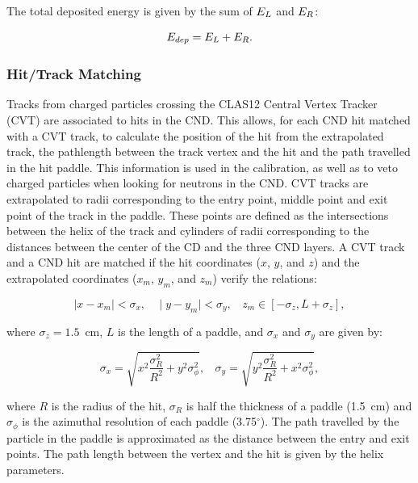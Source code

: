 \documentclass{elsart}
\begin{document}
\noindent
The total deposited energy is given by the sum of $E_{\rm{L}}$ and $E_{\rm{R}}$:

\begin{equation}
E_{\rm{dep}}=E_{\rm{L}}+E_{\rm{R}}.
\end{equation}

\subsubsection{Hit/Track Matching}

Tracks from charged particles crossing the CLAS12 Central Vertex Tracker (CVT) are associated to hits in
the CND. This allows, for each CND hit matched with a CVT track, to calculate the position of the hit from the
extrapolated track, the pathlength between the track vertex and the hit and the path travelled in the hit
paddle. This information is used in the calibration, as well as to veto charged particles when looking for neutrons
in the CND. CVT tracks are extrapolated to radii corresponding to the entry point, middle point and exit point of
the track in the paddle. These points are defined as the intersections between the helix of the track and cylinders
of radii corresponding to the distances between the center of the CD and the three CND layers. A CVT track and
a CND hit are matched if the hit coordinates ($x$, $y$, and $z$) and the extrapolated coordinates ($x_m$,
$y_m$, and $z_m$) verify the relations:

\vfil
\eject

\begin{equation}
\mid x-x_m \mid < \sigma_x ,~~~~\mid y-y_m \mid < \sigma_y , ~~~~z_m  \in [-\sigma_z,L+\sigma_z],
\end{equation}

\noindent

where $\sigma_z=1.5$~cm, $ L$ is the length of a paddle, and $\sigma_x$ and $\sigma_y$ are given by:

\begin{equation}
\sigma_x= \sqrt{x^2\frac{\sigma_R^2}{R^2}+y^2\sigma_\phi^2},~~~~
\sigma_y= \sqrt{y^2\frac{\sigma_R^2}{R^2}+x^2\sigma_\phi^2},
\end{equation}

\noindent
where $R$ is the radius of the hit, $\sigma_R$ is half the thickness of a paddle (1.5~cm) and $\sigma_\phi$
is the azimuthal resolution of each paddle (3.75$^\circ$). The path travelled by the particle in the paddle is
approximated as the distance between the entry and exit points. The path length between the vertex and the
hit is given by the helix parameters.
\end{document}

